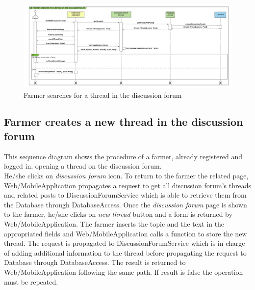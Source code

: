 \newpage
\begin{landscape}
\begin{figure}[t!]
\vspace*{1.5cm}
\noindent
\centering
\centerline{\includegraphics[scale= 0.108]{./Images/Sequence diagram/Farmer searches for a thread on the discussion forum.png}}
    \caption{Farmer searches for a thread in the discussion forum}
    \vspace*{-12cm}
\end{figure}
\fillandplacepagenumber
\end{landscape}

\subsection{Farmer creates a new thread in the discussion forum}

This sequence diagram shows the procedure of a farmer, already registered and logged in, opening a thread on the discussion forum.\\
He/she clicks on \textit{discussion forum} icon. To return to the farmer the related page, Web/MobileApplication propagates a request to get all discussion forum's threads and related posts to DiscussionForumService which is able to retrieve them from the Database through DatabaseAccess. 
Once the \textit{discussion forum} page is shown to the farmer, he/she clicks on \textit{new thread} button and a form is returned by Web/MobileApplication. The farmer inserts the topic and the text in the appropriated fields and Web/MobileApplication calls a function to store the new thread. The request is propagated to DiscussionForumService which is in charge of  adding additional information to the thread before propagating the request to Database through DatabaseAccess. The result is returned to Web/MobileApplication following the same path. If result is false the operation must be repeated.


